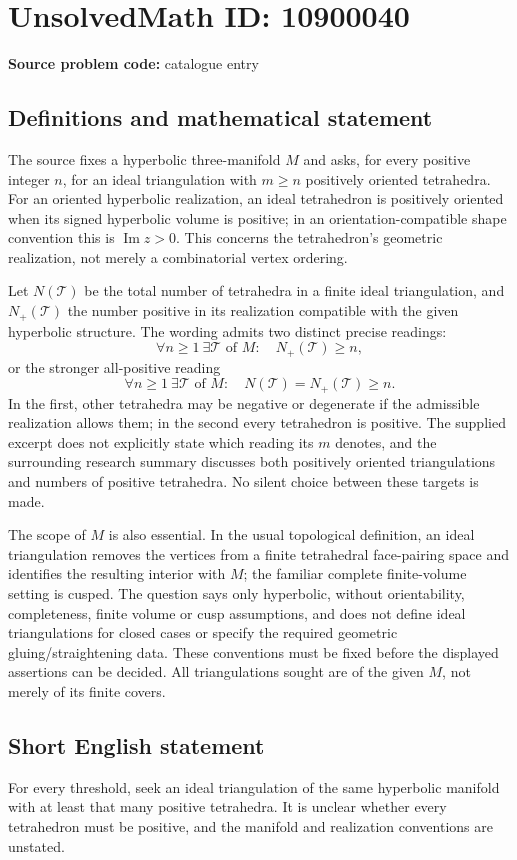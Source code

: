 \documentclass[11pt]{article}
\begin{document}
\section*{UnsolvedMath ID: 10900040}
\textbf{Source problem code:} catalogue entry
\subsection{Definitions and mathematical statement}
The source fixes a hyperbolic three-manifold \(M\) and asks, for every positive integer \(n\), for an ideal triangulation with \(m\geq n\) positively oriented tetrahedra. For an oriented hyperbolic realization, an ideal tetrahedron is positively oriented when its signed hyperbolic volume is positive; in an orientation-compatible shape convention this is \(\operatorname{Im}z>0\). This concerns the tetrahedron's geometric realization, not merely a combinatorial vertex ordering.

Let \(N(\mathcal T)\) be the total number of tetrahedra in a finite ideal triangulation, and \(N_+(\mathcal T)\) the number positive in its realization compatible with the given hyperbolic structure. The wording admits two distinct precise readings:
\[\forall n\geq1\ \exists\mathcal T\text{ of }M:\quad N_+(\mathcal T)\geq n,\]
or the stronger all-positive reading
\[\forall n\geq1\ \exists\mathcal T\text{ of }M:\quad
N(\mathcal T)=N_+(\mathcal T)\geq n.\]
In the first, other tetrahedra may be negative or degenerate if the admissible realization allows them; in the second every tetrahedron is positive. The supplied excerpt does not explicitly state which reading its \(m\) denotes, and the surrounding research summary discusses both positively oriented triangulations and numbers of positive tetrahedra. No silent choice between these targets is made.

The scope of \(M\) is also essential. In the usual topological definition, an ideal triangulation removes the vertices from a finite tetrahedral face-pairing space and identifies the resulting interior with \(M\); the familiar complete finite-volume setting is cusped. The question says only hyperbolic, without orientability, completeness, finite volume or cusp assumptions, and does not define ideal triangulations for closed cases or specify the required geometric gluing/straightening data. These conventions must be fixed before the displayed assertions can be decided. All triangulations sought are of the given \(M\), not merely of its finite covers.
\subsection{Short English statement}
For every threshold, seek an ideal triangulation of the same hyperbolic manifold with at least that many positive tetrahedra. It is unclear whether every tetrahedron must be positive, and the manifold and realization conventions are unstated.
\end{document}
